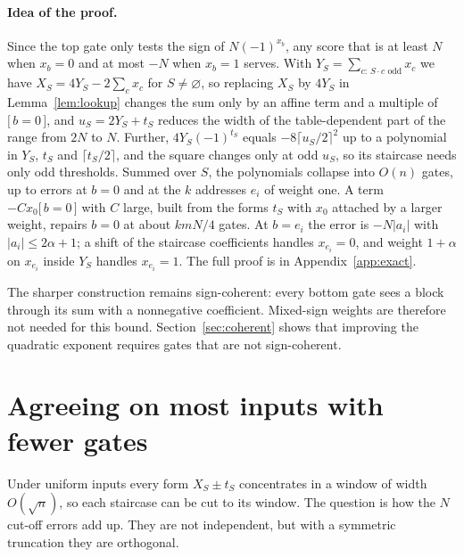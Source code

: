 \documentclass[11pt,letterpaper]{article}
\theoremstyle{remark}
\newcommand{\ind}[1]{\bigl[\,#1\,\bigr]}
\begin{document}
\paragraph*{Idea of the proof.}
Since the top gate only tests the sign of $N(-1)^{x_b}$, any score that is
at least $N$ when $x_b=0$ and at most $-N$ when $x_b=1$ serves. With
$Y_S=\sum_{c:\,S\cdot c\text{ odd}}x_c$ we have $X_S=4Y_S-2\sum_cx_c$ for
$S\ne\varnothing$, so replacing $X_S$ by $4Y_S$ in Lemma~\ref{lem:lookup}
changes the sum only by an affine term and a multiple of $\ind{b=0}$, and
$u_S=2Y_S+t_S$ reduces the width of the table-dependent part of the range
from $2N$ to $N$. Further, $4Y_S(-1)^{t_S}$
equals $-8\lceil u_S/2\rceil^2$ up to a polynomial in $Y_S$, $t_S$ and
$\lceil t_S/2\rceil$, and the square changes only at odd $u_S$, so its
staircase needs only odd thresholds. Summed over $S$, the polynomials collapse
into $O(n)$ gates, up to errors at $b=0$ and at the $k$ addresses $e_i$ of
weight one. A term $-Cx_0\ind{b=0}$ with $C$ large, built from the forms
$t_S$ with $x_0$ attached by a larger weight, repairs $b=0$ at about $kmN/4$
gates. At $b=e_i$ the error is $-N|a_i|$
with $|a_i|\le2\alpha+1$; a shift of the staircase coefficients handles
$x_{e_i}=0$, and weight $1+\alpha$ on $x_{e_i}$ inside $Y_S$ handles
$x_{e_i}=1$. The full proof is in Appendix~\ref{app:exact}.

The sharper construction remains sign-coherent: every bottom gate sees a block
through its sum with a nonnegative coefficient. Mixed-sign weights
are therefore not needed for this bound. Section~\ref{sec:coherent} shows
that improving the quadratic exponent requires gates that are not
sign-coherent.


\section{Agreeing on most inputs with fewer gates}\label{sec:avgupper}

Under uniform inputs every form $X_S\pm t_S$ concentrates in a window of
width $O(\sqrt n)$, so each staircase can be cut to its window. The question
is how the $N$ cut-off errors add up. They are not independent, but with a
symmetric truncation they are orthogonal.
\end{document}
